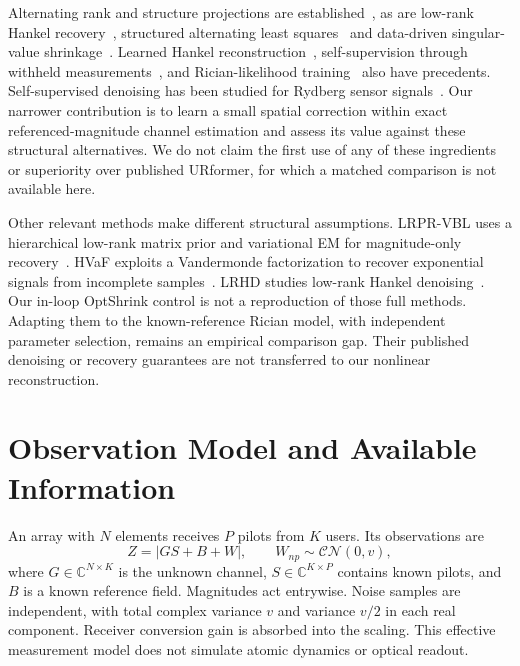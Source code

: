 \documentclass[10pt,journal,letterpaper]{IEEEtran}
\newcommand{\CN}{\mathcal{CN}}
\begin{document}
Alternating rank and structure projections are established~\cite{cadzow1988}, as are low-rank Hankel recovery~\cite{chen2014emac,yin2021}, structured alternating least squares~\cite{zachariah2012} and data-driven singular-value shrinkage~\cite{nadakuditi2014}. Learned Hankel reconstruction~\cite{huang2021}, self-supervision through withheld measurements~\cite{yaman2020,luo2023}, and Rician-likelihood training~\cite{parker2023} also have precedents. Self-supervised denoising has been studied for Rydberg sensor signals~\cite{liu2026}. Our narrower contribution is to learn a small spatial correction within exact referenced-magnitude channel estimation and assess its value against these structural alternatives. We do not claim the first use of any of these ingredients or superiority over published URformer, for which a matched comparison is not available here.

Other relevant methods make different structural assumptions. LRPR-VBL uses a hierarchical low-rank matrix prior and variational EM for magnitude-only recovery~\cite{liu2018lrpr}. HVaF exploits a Vandermonde factorization to recover exponential signals from incomplete samples~\cite{ying2018hvaf}. LRHD studies low-rank Hankel denoising~\cite{yin2021}. Our in-loop OptShrink control is not a reproduction of those full methods. Adapting them to the known-reference Rician model, with independent parameter selection, remains an empirical comparison gap. Their published denoising or recovery guarantees are not transferred to our nonlinear reconstruction.

\section{Observation Model and Available Information}
\label{sec:model}
An array with $N$ elements receives $P$ pilots from $K$ users. Its observations are
\begin{equation}
 Z=|GS+B+W|,\qquad W_{np}\sim\CN(0,v),
 \label{eq:model}
\end{equation}
where $G\in\mathbb C^{N\times K}$ is the unknown channel, $S\in\mathbb C^{K\times P}$ contains known pilots, and $B$ is a known reference field. Magnitudes act entrywise. Noise samples are independent, with total complex variance $v$ and variance $v/2$ in each real component. Receiver conversion gain is absorbed into the scaling. This effective measurement model does not simulate atomic dynamics or optical readout.
\end{document}
